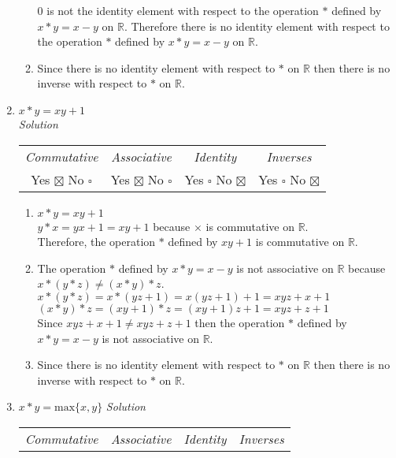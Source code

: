 \documentclass[12pt]{article}
\begin{document}
\begin{enumerate}
\begin{enumerate}
                $0$ is not the identity element with respect to the operation $*$ defined by $x * y = x - y$ 
                on $\mathbb{R}$. Therefore there is no identity element with respect to the operation $*$ 
                defined by $x * y = x - y$ on $\mathbb{R}$.
              \item Since there is no identity element with respect to $*$ on $\mathbb{R}$ then there 
                is no inverse with respect to $*$ on $\mathbb{R}$.
            \end{enumerate}
					\item $x * y = xy + 1 $ \\
						\medskip
						\textit{Solution}
						\medskip
						\begin{tabular}{c c c c}
							\textit{Commutative} & \textit{Associative} & \textit{Identity} & \textit{Inverses} \\
							Yes $\boxtimes$ No $\square$ & Yes $\boxtimes$ No $\square$ & Yes $\square$ No $\boxtimes$ & Yes $\square$ No $\boxtimes$ \\
						\end{tabular}
						\begin{enumerate}
							\item $x * y  = xy + 1 $ \\
								$y * x = yx + 1 = xy + 1$ because $\times$ is commutative on $\mathbb{R}$. \\
								Therefore, the operation $*$ defined by $xy + 1$ is commutative on $\mathbb{R}$.
							\item The operation $*$ defined by $x * y = x - y$ is not associative on $\mathbb{R}$ because $x * (y * z) \neq (x * y) * z$. \\
								$x * (y * z) = x * (yz + 1) = x(yz + 1) + 1 = xyz + x + 1$ \\
								$(x * y) * z = (xy + 1) * z = (xy + 1)z + 1 = xyz + z + 1$ \\
								Since $xyz + x + 1 \neq xyz + z + 1$ then the operation $*$ defined by $x * y = x - y$ is not associative on $\mathbb{R}$.
							\item Since there is no identity element with respect to $*$ on $\mathbb{R}$ then there is no inverse with respect to $*$ on $\mathbb{R}$.
						\end{enumerate}
					\item $x * y = \text{max}\{x,y\}$
						\medskip
						\textit{Solution}
						\medskip
						\begin{tabular}{c c c c}
							\textit{Commutative} & \textit{Associative} & \textit{Identity} & \textit{Inverses} \\

\end{tabular}
\end{enumerate}
\end{document}
